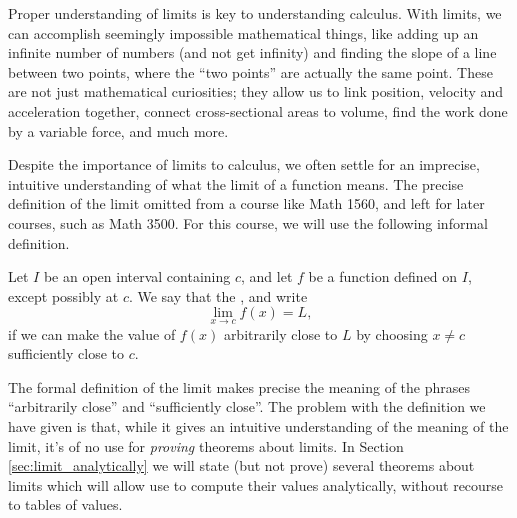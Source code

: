 \enlargethispage{\baselineskip}

Proper understanding of limits is key to understanding calculus. With limits, we can accomplish seemingly impossible mathematical things, like adding up an infinite number of numbers (and not get infinity) and finding the slope of a line between two points, where the ``two points'' are actually the same point. These are not just mathematical curiosities; they allow us to link position, velocity and acceleration together, connect cross-sectional areas to volume, find the work done by a variable force, and much more.


Despite the importance of limits to calculus, we often settle for an imprecise, intuitive understanding of what the limit of a function means. The precise definition of the limit omitted from a course like Math 1560, and left for later courses, such as Math 3500. For this course, we will use the following informal definition.

\smallskip

{

\indent Let $I$ be an open interval containing $c$, and let $f$ be a function defined on $I$, except possibly at $c$. 
We say that the , and write 
\[
\lim_{x\rightarrow c} f(x) = L,
\]
if we can make the value of $f(x)$ arbitrarily close to $L$ by choosing $x\neq c$ sufficiently close to $c$.}

\enlargethispage{2\baselineskip}

The formal definition of the limit makes precise the meaning of the phrases ``arbitrarily close'' and ``sufficiently close''. The problem with the definition we have given is that, while it gives an intuitive understanding of the meaning of the limit, it's of no use for \textit{proving} theorems about limits. In Section \ref{sec:limit_analytically} we will state (but not prove) several theorems about limits which will allow use to compute their values analytically, without recourse to tables of values.

